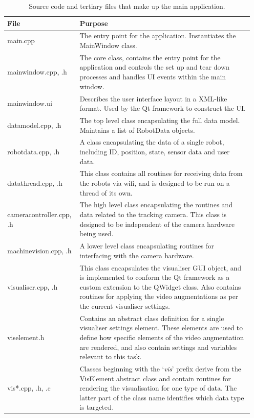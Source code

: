 \begin{longtable}{ l p{10cm} }
\caption[Application Code Files]{Source code and tertiary files that make up the main application.}\\
 File & Purpose\\ 
 \hline
 main.cpp & The entry point for the application. Instantiates the MainWindow class.\\
 mainwindow.cpp, .h & The core class, contains the entry point for the application and controls the set up and tear down processes and handles UI events within the main window.\\
 mainwindow.ui & Describes the user interface layout in a XML-like format. Used by the Qt framework to construct the UI.\\
 datamodel.cpp, .h & The top level class encapsulating the full data model. Maintains a list of RobotData objects.\\
 robotdata.cpp, .h & A class encapsulating the data of a single robot, including ID, position, state, sensor data and user data.\\
 datathread.cpp, .h & This class contains all routines for receiving data from the robots via wifi, and is designed to be run on a thread of its own.\\
 cameracontroller.cpp, .h & The high level class encapsulating the routines and data related to the tracking camera. This class is designed to be independent of the camera hardware being used.\\
 machinevision.cpp, .h & A lower level class encapsulating routines for interfacing with the camera hardware.\\
 visualiser.cpp, .h & This class encapsulates the visualiser GUI object, and is implemented to conform the Qt framework as a custom extension to the QWidget class. Also contains routines for applying the video augmentations as per the current visualiser settings.\\
 viselement.h & Contains an abstract class definition for a single visualiser settings element. These elements are used to define how specific elements of the video augmentation are rendered, and also contain settings and variables relevant to this task. \\
 vis*.cpp, .h, .c & Classes beginning with the `\textit{vis}' prefix derive from the VisElement abstract class and contain routines for rendering the visualisation for one type of data. The latter part of the class name identifies which data type is targeted.\\

\end{longtable}
